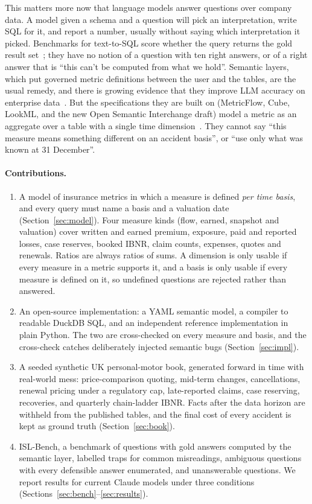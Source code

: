 \documentclass[11pt]{article}
\begin{document}
This matters more now that language models answer questions over company data. A model given a schema and a
question will pick an interpretation, write SQL for it, and report a number, usually without saying which
interpretation it picked. Benchmarks for text-to-SQL score whether the query returns the gold result
set~\cite{yu2018spider,li2023bird,lei2025spider2}; they have no notion of a question with ten right answers, or
of a right answer that is ``this can't be computed from what we hold''. Semantic layers, which put governed
metric definitions between the user and the tables, are the usual remedy, and there is growing evidence that
they improve LLM accuracy on enterprise data~\cite{sequeda2023benchmark,allemang2024ontologies,ganz2026sltext2sql}.
But the specifications they are built on (MetricFlow, Cube, LookML, and the new Open Semantic Interchange
draft) model a metric as an aggregate over a table with a single time dimension~\cite{dbt_metrics_docs,
cube_measures_docs,lookml_docs,osi_spec}. They cannot say ``this measure means something different on an
accident basis'', or ``use only what was known at 31 December''.

\paragraph{Contributions.}
\begin{enumerate}
\item A model of insurance metrics in which a measure is defined \emph{per time basis}, and every query must
name a basis and a valuation date (Section~\ref{sec:model}). Four measure kinds (flow, earned, snapshot and
valuation) cover written and earned premium, exposure, paid and reported losses, case reserves, booked IBNR,
claim counts, expenses, quotes and renewals. Ratios are always ratios of sums. A dimension is only usable if
every measure in a metric supports it, and a basis is only usable if every measure is defined on it, so
undefined questions are rejected rather than answered.
\item An open-source implementation: a YAML semantic model, a compiler to readable DuckDB SQL, and an independent
reference implementation in plain Python. The two are cross-checked on every measure and basis, and the cross-check
catches deliberately injected semantic bugs (Section~\ref{sec:impl}).
\item A seeded synthetic UK personal-motor book, generated forward in time with real-world mess: price-comparison
quoting, mid-term changes, cancellations, renewal pricing under a regulatory cap, late-reported claims, case
reserving, recoveries, and quarterly chain-ladder IBNR. Facts after the data horizon are withheld from the
published tables, and the final cost of every accident is kept as ground truth (Section~\ref{sec:book}).
\item ISL-Bench, a benchmark of \BenchQuestions{} questions with gold answers computed by the semantic layer,
labelled traps for common misreadings, ambiguous questions with every defensible answer enumerated, and
unanswerable questions. We report results for current Claude models under three conditions
(Sections~\ref{sec:bench}--\ref{sec:results}).
\end{enumerate}
\end{document}
